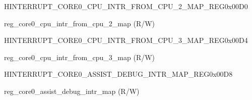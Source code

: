 \begin{register}{H}{INTERRUPT\_CORE0\_CPU\_INTR\_FROM\_CPU\_2\_MAP\_REG}{0x00D0}\label{regdesc:INTERRUPTCORE0CPUINTRFROMCPU2MAPREG}
%
%
\regnewline%
\begin{regdesc}\begin{reglist}
\label{fielddesc:INTERRUPTCORE0CPUINTRFROMCPU2MAP}\item [INTERRUPT\_CORE0\_CPU\_INTR\_FROM\_CPU\_2\_MAP] reg\_core0\_cpu\_intr\_from\_cpu\_2\_map (R/W)
\end{reglist}\end{regdesc}
\end{register}


\begin{register}{H}{INTERRUPT\_CORE0\_CPU\_INTR\_FROM\_CPU\_3\_MAP\_REG}{0x00D4}\label{regdesc:INTERRUPTCORE0CPUINTRFROMCPU3MAPREG}
%
%
\regnewline%
\begin{regdesc}\begin{reglist}
\label{fielddesc:INTERRUPTCORE0CPUINTRFROMCPU3MAP}\item [INTERRUPT\_CORE0\_CPU\_INTR\_FROM\_CPU\_3\_MAP] reg\_core0\_cpu\_intr\_from\_cpu\_3\_map (R/W)
\end{reglist}\end{regdesc}
\end{register}


\begin{register}{H}{INTERRUPT\_CORE0\_ASSIST\_DEBUG\_INTR\_MAP\_REG}{0x00D8}\label{regdesc:INTERRUPTCORE0ASSISTDEBUGINTRMAPREG}
%
%
\regnewline%
\begin{regdesc}\begin{reglist}
\label{fielddesc:INTERRUPTCORE0ASSISTDEBUGINTRMAP}\item [INTERRUPT\_CORE0\_ASSIST\_DEBUG\_INTR\_MAP] reg\_core0\_assist\_debug\_intr\_map (R/W)
\end{reglist}\end{regdesc}
\end{register}


